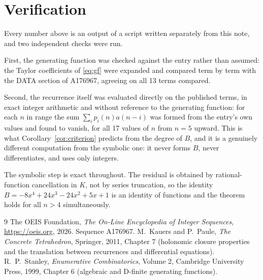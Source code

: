 \documentclass[11pt,a4paper]{article}
\theoremstyle{plain}
\theoremstyle{definition}
\begin{document}
\section{Verification}

Every number above is an output of a script written separately from this note, and two
independent checks were run.

First, the generating function was checked against the entry rather than assumed: the
Taylor coefficients of \eqref{eq:gf} were expanded and compared term by term with the DATA
section of A176967, agreeing on all 13 terms compared.

Second, the recurrence itself was evaluated directly on the published terms, in exact
integer arithmetic and without reference to the generating function: for each $n$ in range
the sum $\sum_{i}p_{i}(n)a(n-i)$ was formed from the entry's own values and found to
vanish, for all 17 values of $n$ from $n=5$ upward. This is what
Corollary~\ref{cor:criterion} predicts from the degree of $B$, and it is a genuinely
different computation from the symbolic one: it never forms $B$, never differentiates, and
uses only integers.

The symbolic step is exact throughout. The residual is obtained by rational-function
cancellation in $K$, not by series truncation, so the identity $B=- 8 x^{4} + 24 x^{3} - 24 x^{2} + 5 x + 1$ is an
identity of functions and the theorem holds for all $n>4$ simultaneously.

\begin{thebibliography}{9}
 The OEIS Foundation, \emph{The On-Line Encyclopedia of Integer Sequences},
\url{https://oeis.org}, 2026. Sequence A176967.
 M.~Kauers and P.~Paule, \emph{The Concrete Tetrahedron}, Springer, 2011,
Chapter 7 (holonomic closure properties and the translation between recurrences and
differential equations).
 R.~P.~Stanley, \emph{Enumerative Combinatorics}, Volume 2, Cambridge
University Press, 1999, Chapter 6 (algebraic and D-finite generating functions).
\end{thebibliography}
\end{document}
